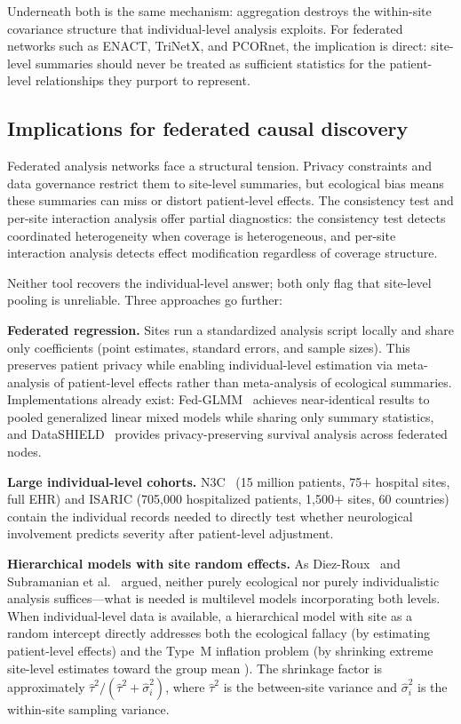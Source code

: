 \documentclass{article}
\begin{document}
Underneath both is the same mechanism: aggregation destroys the within-site
covariance structure that individual-level analysis exploits.  For
federated networks such as ENACT, TriNetX, and PCORnet, the implication
is direct: site-level summaries should never be treated as sufficient
statistics for the patient-level relationships they purport to represent.

\subsection{Implications for federated causal discovery}

Federated analysis networks face a structural tension.  Privacy
constraints and data governance restrict them to site-level summaries, but
ecological bias means these summaries can miss or distort patient-level
effects.  The consistency test and per-site interaction
analysis offer partial diagnostics: the consistency test detects
coordinated heterogeneity when coverage is heterogeneous, and per-site
interaction analysis detects effect modification regardless of coverage
structure.

Neither tool recovers the individual-level answer; both only flag that
site-level pooling is unreliable.  Three approaches go further:

\textbf{Federated regression.}  Sites run a standardized analysis script
locally and share only coefficients (point estimates, standard errors, and
sample sizes).  This preserves patient privacy while enabling
individual-level estimation via meta-analysis of patient-level effects
rather than meta-analysis of ecological summaries.  Implementations already
exist: Fed-GLMM~\cite{chen2023fedglmm} achieves near-identical results to
pooled generalized linear mixed models while sharing only summary statistics,
and DataSHIELD~\cite{wilson2022datashield} provides privacy-preserving
survival analysis across federated nodes.

\textbf{Large individual-level cohorts.}  N3C~\cite{haendel2021n3c}
(15 million patients, 75+ hospital sites, full EHR) and ISARIC (705,000
hospitalized patients, 1,500+ sites, 60 countries) contain the individual
records needed to directly test whether neurological involvement predicts
severity after patient-level adjustment.

\textbf{Hierarchical models with site random effects.}  As
Diez-Roux~\cite{diezroux2000multilevel} and
Subramanian et al.~\cite{subramanian2009revisiting} argued, neither
purely ecological nor purely individualistic analysis suffices---what is
needed is multilevel models incorporating both levels.  When
individual-level data is available, a hierarchical model with site as a
random intercept directly addresses both the ecological fallacy (by
estimating patient-level effects) and the Type~M inflation problem (by
shrinking extreme site-level estimates toward the group mean
\cite{gelman2012multilevel}).  The shrinkage factor is approximately
$\hat\tau^2 / (\hat\tau^2 + \hat\sigma_i^2)$, where $\hat\tau^2$ is
the between-site variance and $\hat\sigma_i^2$ is the within-site
sampling variance.
\end{document}
